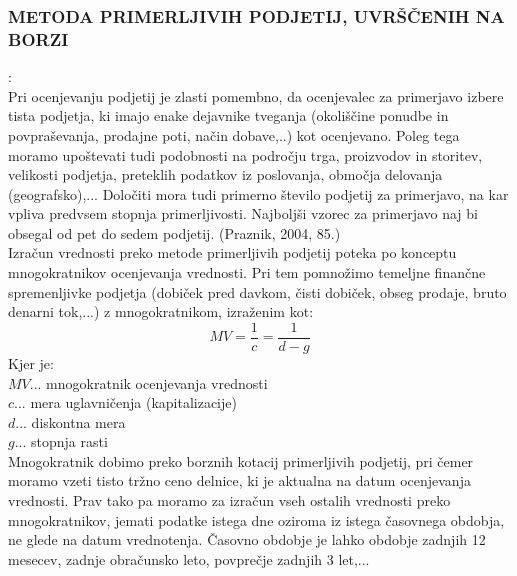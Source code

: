 \documentclass[12pt,a4paper]{amsart}
\theoremstyle{definition} %
\theoremstyle{plain} %
\begin{document}
\subsubsection{METODA PRIMERLJIVIH PODJETIJ, UVRŠČENIH NA BORZI}:\\
Pri ocenjevanju podjetij je zlasti pomembno, da ocenjevalec za primerjavo izbere tista podjetja, ki imajo enake dejavnike tveganja (okoliščine ponudbe in povpraševanja, prodajne poti, način dobave,..) kot ocenjevano. Poleg tega moramo upoštevati tudi podobnosti na področju trga, proizvodov in storitev, velikosti podjetja, preteklih podatkov iz poslovanja, območja delovanja (geografsko),... Določiti mora tudi primerno število podjetij za primerjavo, na kar vpliva predvsem stopnja primerljivosti. Najboljši vzorec za primerjavo naj bi obsegal od pet do sedem podjetij. (Praznik, 2004, 85.)\\
Izračun vrednosti preko metode primerljivih podjetij poteka po konceptu mnogokratnikov ocenjevanja vrednosti. Pri tem pomnožimo temeljne finančne spremenljivke podjetja (dobiček pred davkom, čisti dobiček, obseg prodaje, bruto denarni tok,...) z mnogokratnikom, izraženim kot:
\begin{equation}
MV=\frac{1}{c}=\frac{1}{d-g}
\end{equation}
Kjer je:\\
$MV$... mnogokratnik ocenjevanja vrednosti\\
$c$... mera uglavničenja (kapitalizacije)\\
$d$... diskontna mera\\
$g$... stopnja rasti\\
Mnogokratnik dobimo preko borznih kotacij primerljivih podjetij, pri čemer moramo vzeti tisto tržno ceno delnice, ki je aktualna na datum ocenjevanja vrednosti. Prav tako  pa moramo za izračun vseh ostalih vrednosti preko mnogokratnikov, jemati podatke istega dne oziroma iz istega časovnega obdobja, ne glede na datum vrednotenja. Časovno obdobje je lahko obdobje zadnjih 12 mesecev, zadnje obračunsko leto, povprečje zadnjih 3 let,...
\end{document}
